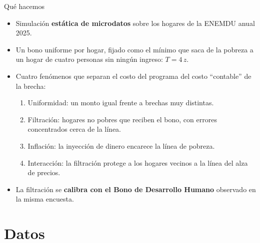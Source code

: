 \documentclass[aspectratio=169,11pt]{beamer}
\begin{document}
\begin{frame}{Qué hacemos}
  \begin{itemize}
    \item Simulación \textbf{estática de microdatos} sobre los \cNHog{} hogares de la ENEMDU anual 2025.
    \item Un bono uniforme por hogar, fijado como el mínimo que saca de la pobreza a un hogar de cuatro personas
      sin ningún ingreso: $T = 4\,z$.
    \item Cuatro fenómenos que separan el costo del programa del costo ``contable'' de la brecha:
      \begin{enumerate}
        \item \alert{Uniformidad}: un monto igual frente a brechas muy distintas.
        \item \alert{Filtración}: hogares no pobres que reciben el bono, con errores concentrados cerca de la línea.
        \item \alert{Inflación}: la inyección de dinero encarece la línea de pobreza.
        \item \alert{Interacción}: la filtración protege a los hogares vecinos a la línea del alza de precios.
      \end{enumerate}
    \item La filtración se \textbf{calibra con el Bono de Desarrollo Humano} observado en la misma encuesta.
  \end{itemize}
\end{frame}

\section{Datos}
\end{document}
